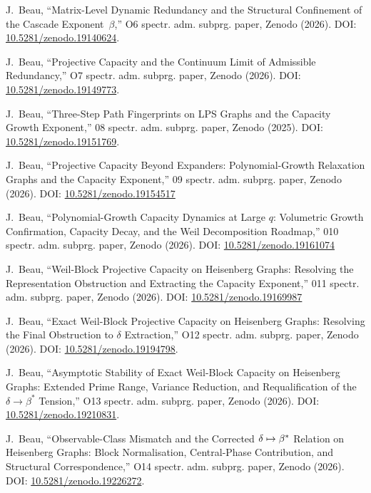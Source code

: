 J.~Beau,
``Matrix-Level Dynamic Redundancy and the Structural Confinement of the Cascade Exponent~$\beta$,''
O6 spectr. adm. subprg. paper, Zenodo (2026).
DOI: \href{https://doi.org/10.5281/zenodo.19140624}{10.5281/zenodo.19140624}.

J.~Beau,
``Projective Capacity and the Continuum Limit of Admissible Redundancy,''
O7 spectr. adm. subprg. paper, Zenodo (2026).
DOI: \href{https://doi.org/10.5281/zenodo.19149773}{10.5281/zenodo.19149773}.

J.~Beau,
``Three-Step Path Fingerprints on LPS Graphs and the Capacity Growth Exponent,''
08 spectr. adm. subprg. paper, Zenodo (2025).
DOI: \href{https://doi.org/10.5281/zenodo.19151769}{10.5281/zenodo.19151769}.

J.~Beau,
``Projective Capacity Beyond Expanders: Polynomial-Growth Relaxation Graphs and the Capacity Exponent,''
09 spectr. adm. subprg. paper, Zenodo (2026).
DOI: \href{https://doi.org/10.5281/zenodo.19154517}{10.5281/zenodo.19154517}

J.~Beau,
``Polynomial-Growth Capacity Dynamics at Large $q$: Volumetric Growth Confirmation, Capacity Decay, and the Weil
Decomposition Roadmap,''
010 spectr. adm. subprg. paper, Zenodo (2026).
DOI: \href{https://doi.org/10.5281/zenodo.19161074}{10.5281/zenodo.19161074}

J.~Beau,
``Weil-Block Projective Capacity on Heisenberg Graphs: Resolving the Representation Obstruction and Extracting the
Capacity Exponent,''
011 spectr. adm. subprg. paper, Zenodo (2026).
DOI: \href{https://doi.org/10.5281/zenodo.19169987}{10.5281/zenodo.19169987}

J.~Beau,
``Exact Weil-Block Projective Capacity on Heisenberg Graphs: Resolving the Final Obstruction to $\delta$ Extraction,''
O12 spectr. adm. subprg. paper, Zenodo (2026).
DOI: \href{https://doi.org/10.5281/zenodo.19194798}{10.5281/zenodo.19194798}.

J.~Beau,
``Asymptotic Stability of Exact Weil-Block Capacity on Heisenberg Graphs: Extended Prime Range, Variance Reduction,
and Requalification of the \(\delta \to \beta^*\) Tension,''
O13 spectr. adm. subprg. paper, Zenodo (2026).
DOI: \href{https://doi.org/10.5281/zenodo.19210831}{10.5281/zenodo.19210831}.

J.~Beau,
``Observable-Class Mismatch and the Corrected $\delta \mapsto \beta^*$ Relation on Heisenberg Graphs:
Block Normalisation, Central-Phase Contribution,
and Structural Correspondence,''
O14 spectr. adm. subprg. paper, Zenodo (2026).
DOI: \href{https://doi.org/10.5281/zenodo.19226272}{10.5281/zenodo.19226272}.

